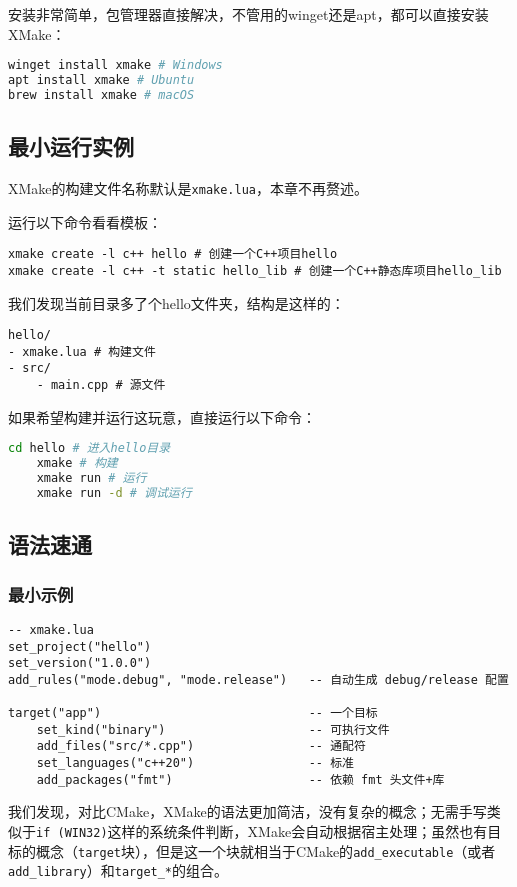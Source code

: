 安装非常简单，包管理器直接解决，不管用的winget还是apt，都可以直接安装XMake：
\begin{lstlisting}[language=bash]
winget install xmake # Windows
apt install xmake # Ubuntu
brew install xmake # macOS
\end{lstlisting}

\subsection{最小运行实例}

XMake的构建文件名称默认是\texttt{xmake.lua}，本章不再赘述。

运行以下命令看看模板：
\begin{lstlisting}
xmake create -l c++ hello # 创建一个C++项目hello
xmake create -l c++ -t static hello_lib # 创建一个C++静态库项目hello_lib
\end{lstlisting}

我们发现当前目录多了个hello文件夹，结构是这样的：
\begin{lstlisting}
hello/
- xmake.lua # 构建文件
- src/
    - main.cpp # 源文件
\end{lstlisting}

如果希望构建并运行这玩意，直接运行以下命令：
\begin{lstlisting}[language=bash]
    cd hello # 进入hello目录
    xmake # 构建
    xmake run # 运行
    xmake run -d # 调试运行
\end{lstlisting}

\subsection{语法速通}
\subsubsection{最小示例}
\begin{lstlisting}
-- xmake.lua
set_project("hello")
set_version("1.0.0")
add_rules("mode.debug", "mode.release")   -- 自动生成 debug/release 配置

target("app")                             -- 一个目标
    set_kind("binary")                    -- 可执行文件
    add_files("src/*.cpp")                -- 通配符
    set_languages("c++20")                -- 标准
    add_packages("fmt")                   -- 依赖 fmt 头文件+库
\end{lstlisting}
我们发现，对比CMake，XMake的语法更加简洁，没有复杂的概念；无需手写类似于\texttt{if (WIN32)}这样的系统条件判断，XMake会自动根据宿主处理；虽然也有目标的概念（\texttt{target}块），但是这一个块就相当于CMake的\texttt{add\_executable}（或者\texttt{add\_library}）和\texttt{target\_*}的组合。


